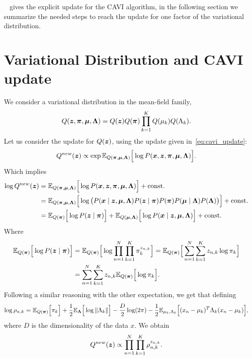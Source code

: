 ~\cite{bishop2006pattern} gives the explicit update for the CAVI algorithm, in the following section we summarize the needed steps to reach the update for one factor of the variational distribution.

\section{Variational Distribution and CAVI update}

We consider a variational distribution in the mean-field family,
\[
  Q(\bm{z}, \bm{\pi}, \bm{\mu}, \bm{\Lambda}) = Q(\bm{z})Q(\bm{\pi})\prod_{k=1}^{K}Q(\mu_{k})Q(\Lambda_{k}).
\]
Let us consider the update for \(Q(\bm{z})\), using the update given in~\ref{eq:cavi_update}:
\[
  Q^{new}(\bm{z}) \propto \exp \mathbb{E}_{Q(\bm{\pi}, \bm{\mu}, \bm{\Lambda})}\Big[\log P(\bm{x}, \bm{z}, \bm{\pi}, \bm{\mu}, \bm{\Lambda})\Big].
\]
Which implies
\[
  \begin{aligned}
    \log Q^{new}(\bm{z}) &= \mathbb{E}_{Q(\bm{\pi}, \bm{\mu}, \bm{\Lambda})}\Big[\log P(\bm{x}, \bm{z}, \bm{\pi}, \bm{\mu}, \bm{\Lambda})\Big] + \text{const.}\\
    &= \mathbb{E}_{Q(\bm{\pi}, \bm{\mu}, \bm{\Lambda})}\Big[\log \big( P(\bm{x} \mid \bm{z}, \bm{\mu}, \bm{\Lambda})P(\bm{z} \mid \bm{\pi})P(\bm{\pi})P(\bm{\mu} \mid \bm{\Lambda})P(\bm{\Lambda}) \big)\Big] + \text{const.}\\
    &= \mathbb{E}_{Q(\bm{\pi})}\Big[\log P(\bm{z} \mid \bm{\pi})\Big] + \mathbb{E}_{Q(\bm{\mu}, \bm{\Lambda})}\Big[\log P(\bm{x} \mid \bm{z}, \bm{\mu}, \bm{\Lambda})\Big] + \text{const.}
  \end{aligned}
\]
Where
\[
  \begin{aligned}
    \mathbb{E}_{Q(\bm{\pi})}\Big[\log P(\bm{z} \mid \bm{\pi})\Big] &=  \mathbb{E}_{Q(\bm{\pi})}\Big[\log \prod_{n=1}^{N}\prod_{k=1}^{K}\pi_{k}^{z_{n,k}}\Big] = \mathbb{E}_{Q(\bm{\pi})}\Big[\sum_{n=1}^{N}\sum_{k=1}^{K}z_{n,k}\log \pi_{k}\Big]\\
    &= \sum_{n=1}^{N}\sum_{k=1}^{K}z_{n,k} \mathbb{E}_{Q(\bm{\pi})}\Big[\log \pi_{k}\Big].
  \end{aligned}
\]
Following a similar reasoning with the other expectation, we get that defining
\[
  \log \rho_{n,k} = \mathbb{E}_{Q(\bm{\pi})}\Big[\pi_{k}\Big] + \frac{1}{2}\mathbb{E}_{\bm{\Lambda}}\Big[\log \| \Lambda_{k}\|\Big] - \frac{D}{2} \log (2\pi) - \frac{1}{2}\mathbb{E}_{\mu_{k}, \Lambda_{k}}\Big[(x_{n} - \mu_{k})^{T}\Lambda_{k}(x_{n} - \mu_{k})\Big],
\]
where \(D\) is the dimensionality of the data \(x\). We obtain
\[
  Q^{new}(\bm{z}) \propto \prod_{n=1}^{N}\prod_{k=1}^{K} \rho_{n,k}^{z_{n,k}}.
\]
